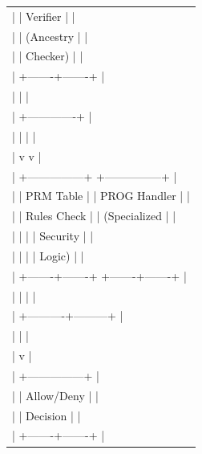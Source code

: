 \begin{figure}[htbp]
{{{\begin{tabular}{l}
|  |   Verifier    |                                                          | \\
|  |  (Ancestry    |                                                          | \\
|  |   Checker)    |                                                          | \\
|  +-------+-------+                                                          | \\
|          |                                                                  | \\
|          +-------------+                                                    | \\
|          |             |                                                    | \\
|          v             v                                                    | \\
|  +---------------+    +---------------+                                     | \\
|  | PRM Table     |    | PROG Handler  |                                     | \\
|  | Rules Check   |    | (Specialized  |                                     | \\
|  |               |    |  Security     |                                     | \\
|  |               |    |  Logic)       |                                     | \\
|  +-------+-------+    +-------+-------+                                     | \\
|          |                    |                                             | \\
|          +----------+---------+                                             | \\
|                     |                                                       | \\
|                     v                                                       | \\
|             +---------------+                                               | \\
|             |  Allow/Deny   |                                               | \\
|             |   Decision    |                                               | \\
|             +-------+-------+                                               | \\

\end{tabular}}}}
\end{figure}

